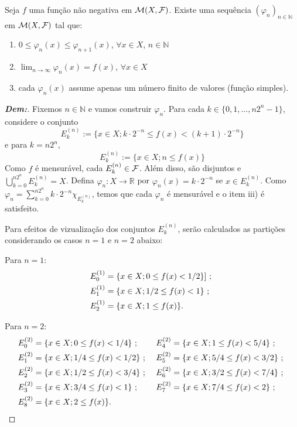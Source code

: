 \begin{theorem*}{}
Seja $f$ uma função não negativa em $\mathcal{M}(X,\mathcal{F})$. Existe uma sequência $(\varphi_n)_{n \in \mathbb{N}}$ em $\mathcal{M}(X,\mathcal{F})$ tal que: %
  \begin{enumerate}[label=\roman*)]
    \item $0 \le \varphi_n(x) \le \varphi_{n+1}(x)$, $\forall x \in X$, $n \in \mathbb{N}$ %
    \item $\lim_{n \rightarrow \infty} \varphi_n(x) = f(x)$, $\forall x \in X$ %
    \item cada $\varphi_n(x)$ assume apenas um número finito de valores (função simples). %
\end{enumerate} 
\end{theorem*}
\begin{proof}[\textbf{Dem:}]
  Fixemos $n \in \mathbb{N}$ e vamos construir $\varphi_n$. Para cada $k \in \{0, 1, \dots, n2^n - 1\}$, considere o conjunto %
$$ E_k^{(n)} := \{x \in X; k \cdot 2^{-n} \le f(x) < (k+1) \cdot 2^{-n}\} $$ %
e para $k = n2^n$, %
$$ E_k^{(n)} := \{x \in X; n \le f(x)\} $$ %
Como $f$ é mensurável, cada $E_k^{(n)} \in \mathcal{F}$. Além disso, 
  são disjuntos e $\bigcup_{k=0}^{n2^n} E_k^{(n)} = X$. %
Defina $\varphi_n: X \rightarrow \mathbb{R}$ por $\varphi_n(x) = k \cdot 2^{-n}$ se $x \in E_k^{(n)}$. %
Como $\varphi_n = \sum_{k=0}^{n2^n} k \cdot 2^{-n} \chi_{E_k^{(n)}}$, temos que cada $\varphi_n$ é mensurável e o item iii) é satisfeito. %

  Para efeitos de vizualização dos conjuntos $E_k^{(n)}$, serão calculados as 
    partições considerando os casos $n=1$ e $n=2$ abaixo:

Para $n=1$: %
\begin{align*}
  E_0^{(1)} &= \{x \in X; 0 \le f(x) < 1/2\}]\text{ ; } \\
    E_1^{(1)} &= \{x \in X; 1/2 \le f(x) < 1\}\text{ ; } \\
    E_2^{(1)} &= \{x \in X; 1 \le f(x)\}.
\end{align*} %

Para $n=2$:
\begin{align*}
    E_0^{(2)} &= \{x \in X; 0 \le f(x) < 1/4\}\text{ ; } &
    E_4^{(2)} &= \{x \in X; 1 \le f(x) < 5/4\}\text{ ; }\\
    E_1^{(2)} &= \{x \in X; 1/4 \le f(x) < 1/2\}\text{ ; } &
    E_5^{(2)} &= \{x \in X; 5/4 \le f(x) < 3/2\}\text{ ; } \\
    E_2^{(2)} &= \{x \in X; 1/2 \le f(x) < 3/4\}\text{ ; } &
    E_6^{(2)} &= \{x \in X; 3/2 \le f(x) < 7/4\}\text{ ; } \\
    E_3^{(2)} &= \{x \in X; 3/4 \le f(x) < 1\}\text{ ; } &
    E_7^{(2)} &= \{x \in X; 7/4 \le f(x) < 2\}\text{ ; } \\
    E_8^{(2)} &= \{x \in X; 2 \le f(x)\}. & &
\end{align*} %


\end{proof}
